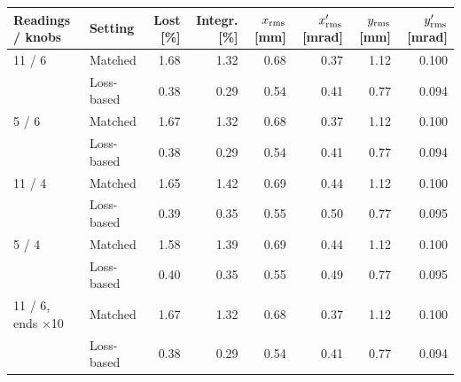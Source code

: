 \begin{tabular}{llrrrrrr}\toprule
Readings / knobs & Setting & Lost [\%] & Integr. [\%] & $x_{\rm rms}$ [mm] & $x'_{\rm rms}$ [mrad] & $y_{\rm rms}$ [mm] & $y'_{\rm rms}$ [mrad]\\\midrule
11 / 6 & Matched & 1.68 & 1.32 & 0.68 & 0.37 & 1.12 & 0.100\\
 & Loss-based & 0.38 & 0.29 & 0.54 & 0.41 & 0.77 & 0.094\\
5 / 6 & Matched & 1.67 & 1.32 & 0.68 & 0.37 & 1.12 & 0.100\\
 & Loss-based & 0.38 & 0.29 & 0.54 & 0.41 & 0.77 & 0.094\\
11 / 4 & Matched & 1.65 & 1.42 & 0.69 & 0.44 & 1.12 & 0.100\\
 & Loss-based & 0.39 & 0.35 & 0.55 & 0.50 & 0.77 & 0.095\\
5 / 4 & Matched & 1.58 & 1.39 & 0.69 & 0.44 & 1.12 & 0.100\\
 & Loss-based & 0.40 & 0.35 & 0.55 & 0.49 & 0.77 & 0.095\\
11 / 6, ends ×10 & Matched & 1.67 & 1.32 & 0.68 & 0.37 & 1.12 & 0.100\\
 & Loss-based & 0.38 & 0.29 & 0.54 & 0.41 & 0.77 & 0.094\\
\bottomrule\end{tabular}
